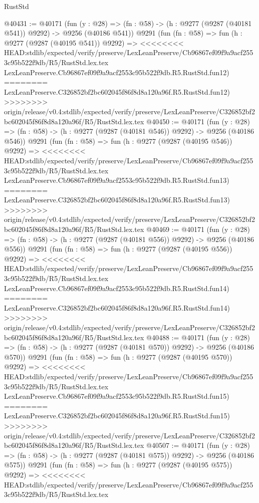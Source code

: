 \begin{lexlean}{RustStd}
\begin{coremodule}
{\begin{coremodule}
{{{{{{{{{{{{{{{{{{{{{{{{{{{{{{{{{{{{{{{{{{{{{{{{{{{{{{{@40431 := @40171
    (fun (y : @28) => (fn : @58) -> (h : @9277 (@9287 (@40181 @541)) @9292) -> @9256 (@40186 @541))
    @9291
    (fun (fn : @58) =>
    fun (h : @9277 (@9287 (@40195 @541)) @9292) =>
<<<<<<<< HEAD:stdlib/expected/verify/preserve/LexLeanPreserve/Cb96867ef09f9a9acf2553c95b522f9db/R5/RustStd.lex.tex
    LexLeanPreserve.Cb96867ef09f9a9acf2553c95b522f9db.R5.RustStd.fun12)
========
    LexLeanPreserve.C326852bf2bc602045f86f8d8a120a96f.R5.RustStd.fun12)
>>>>>>>> origin/release/v0.4:stdlib/expected/verify/preserve/LexLeanPreserve/C326852bf2bc602045f86f8d8a120a96f/R5/RustStd.lex.tex
@40450 := @40171
    (fun (y : @28) => (fn : @58) -> (h : @9277 (@9287 (@40181 @546)) @9292) -> @9256 (@40186 @546))
    @9291
    (fun (fn : @58) =>
    fun (h : @9277 (@9287 (@40195 @546)) @9292) =>
<<<<<<<< HEAD:stdlib/expected/verify/preserve/LexLeanPreserve/Cb96867ef09f9a9acf2553c95b522f9db/R5/RustStd.lex.tex
    LexLeanPreserve.Cb96867ef09f9a9acf2553c95b522f9db.R5.RustStd.fun13)
========
    LexLeanPreserve.C326852bf2bc602045f86f8d8a120a96f.R5.RustStd.fun13)
>>>>>>>> origin/release/v0.4:stdlib/expected/verify/preserve/LexLeanPreserve/C326852bf2bc602045f86f8d8a120a96f/R5/RustStd.lex.tex
@40469 := @40171
    (fun (y : @28) => (fn : @58) -> (h : @9277 (@9287 (@40181 @556)) @9292) -> @9256 (@40186 @556))
    @9291
    (fun (fn : @58) =>
    fun (h : @9277 (@9287 (@40195 @556)) @9292) =>
<<<<<<<< HEAD:stdlib/expected/verify/preserve/LexLeanPreserve/Cb96867ef09f9a9acf2553c95b522f9db/R5/RustStd.lex.tex
    LexLeanPreserve.Cb96867ef09f9a9acf2553c95b522f9db.R5.RustStd.fun14)
========
    LexLeanPreserve.C326852bf2bc602045f86f8d8a120a96f.R5.RustStd.fun14)
>>>>>>>> origin/release/v0.4:stdlib/expected/verify/preserve/LexLeanPreserve/C326852bf2bc602045f86f8d8a120a96f/R5/RustStd.lex.tex
@40488 := @40171
    (fun (y : @28) => (fn : @58) -> (h : @9277 (@9287 (@40181 @570)) @9292) -> @9256 (@40186 @570))
    @9291
    (fun (fn : @58) =>
    fun (h : @9277 (@9287 (@40195 @570)) @9292) =>
<<<<<<<< HEAD:stdlib/expected/verify/preserve/LexLeanPreserve/Cb96867ef09f9a9acf2553c95b522f9db/R5/RustStd.lex.tex
    LexLeanPreserve.Cb96867ef09f9a9acf2553c95b522f9db.R5.RustStd.fun15)
========
    LexLeanPreserve.C326852bf2bc602045f86f8d8a120a96f.R5.RustStd.fun15)
>>>>>>>> origin/release/v0.4:stdlib/expected/verify/preserve/LexLeanPreserve/C326852bf2bc602045f86f8d8a120a96f/R5/RustStd.lex.tex
@40507 := @40171
    (fun (y : @28) => (fn : @58) -> (h : @9277 (@9287 (@40181 @575)) @9292) -> @9256 (@40186 @575))
    @9291
    (fun (fn : @58) =>
    fun (h : @9277 (@9287 (@40195 @575)) @9292) =>
<<<<<<<< HEAD:stdlib/expected/verify/preserve/LexLeanPreserve/Cb96867ef09f9a9acf2553c95b522f9db/R5/RustStd.lex.tex
}}}}}}}}}}}}}}}}}}}}}}}}}}}}}}}}}}}}}}}}}}}}}}}}}}}}}}}
\end{coremodule}}
\end{coremodule}
\end{lexlean}
